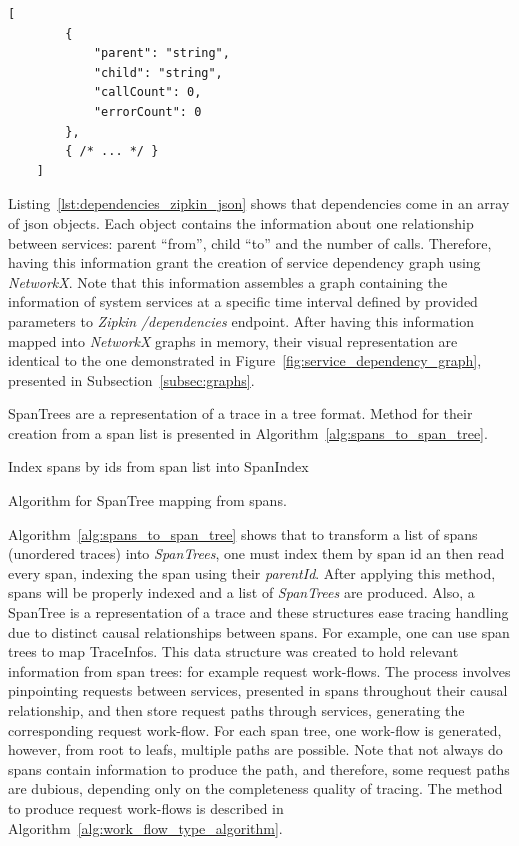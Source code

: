 \begin{lstlisting}[caption={Zipkin dependencies result schema.},captionpos=b, label={lst:dependencies_zipkin_json}]
    [
        {
            "parent": "string",
            "child": "string",
            "callCount": 0,
            "errorCount": 0
        },
        { /* ... */ }
    ]
\end{lstlisting}

Listing~\ref{lst:dependencies_zipkin_json} shows that dependencies come in an array of \gls{json} objects. Each object contains the information about one relationship between services: parent ``from'', child ``to'' and the number of calls. Therefore, having this information grant the creation of service dependency graph using \emph{NetworkX}. Note that this information assembles a graph containing the information of system services at a specific time interval defined by provided parameters to \emph{Zipkin} \emph{/dependencies} endpoint. After having this information mapped into \emph{NetworkX} graphs in memory, their visual representation are identical to the one demonstrated in Figure~\ref{fig:service_dependency_graph}, presented in Subsection~\ref{subsec:graphs}.

SpanTrees are a representation of a trace in a tree format. Method for their creation from a span list is presented in Algorithm~\ref{alg:spans_to_span_tree}.

\begin{algorithm}
    Index spans by ids from span list into SpanIndex\;
    \caption{Algorithm for SpanTree mapping from spans.}
    \label{alg:spans_to_span_tree}
\end{algorithm}

Algorithm~\ref{alg:spans_to_span_tree} shows that to transform a list of spans (unordered traces) into \emph{SpanTrees}, one must index them by span id an then read every span, indexing the span using their \emph{parentId}. After applying this method, spans will be properly indexed and a list of \emph{SpanTrees} are produced. Also, a SpanTree is a representation of a trace and these structures ease tracing handling due to distinct causal relationships between spans. For example, one can use span trees to map TraceInfos. This data structure was created to hold relevant information from span trees: for example request work-flows. The process involves pinpointing requests between services, presented in spans throughout their causal relationship, and then store request paths through services, generating the corresponding request work-flow. For each span tree, one work-flow is generated, however, from root to leafs, multiple paths are possible. Note that not always do spans contain information to produce the path, and therefore, some request paths are dubious, depending only on the completeness quality of tracing. The method to produce request work-flows is described in Algorithm~\ref{alg:work_flow_type_algorithm}.

